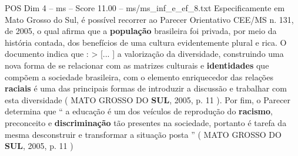 \begin{textsample}{POS Dim 4 – ms – Score 11.00 – ms/ms\_inf\_e\_ef\_8.txt}
Especificamente em Mato Grosso do Sul, é possível recorrer ao Parecer Orientativo CEE/MS n. 131, de 2005, o qual afirma que a \textbf{população} brasileira foi privada, por meio da história contada, dos benefícios de uma cultura evidentemente plural e rica.
O documento indica que : > [... ] a valorização da diversidade, construindo uma nova forma de se relacionar com as matrizes culturais e \textbf{identidades} que compõem a sociedade brasileira, com o elemento enriquecedor das relações \textbf{raciais} é uma das principais formas de introduzir a discussão e trabalhar com esta diversidade ( MATO GROSSO DO \textbf{SUL}, 2005, p. 11 ).
Por fim, o Parecer determina que “ a educação é um dos veículos de reprodução do \textbf{racismo}, preconceito e \textbf{discriminação} tão presentes na sociedade, portanto é tarefa da mesma desconstruir e transformar a situação posta ” ( MATO GROSSO DO \textbf{SUL}, 2005, p. 11 )

\end{textsample}
